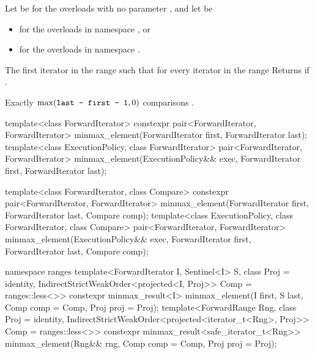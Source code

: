 \begin{itemdescr}
\begin{addedblock}
\pnum
Let  be  for the overloads with no parameter
, and let  be
\begin{itemize}
\item {} for the overloads in namespace , or
\item {} for
  the overloads in namespace .
\end{itemize}
\end{addedblock}

\pnum
\returns
The first iterator
in the range
such that for every iterator
in the range
Returns
if
.

\pnum
\complexity
Exactly
$\max(\texttt{last - first - 1}, 0)$
 comparisons
.
\end{itemdescr}


%
\begin{itemdecl}
template<class ForwardIterator>
  constexpr pair<ForwardIterator, ForwardIterator>
    minmax_element(ForwardIterator first, ForwardIterator last);
template<class ExecutionPolicy, class ForwardIterator>
  pair<ForwardIterator, ForwardIterator>
    minmax_element(ExecutionPolicy&& exec,
                   ForwardIterator first, ForwardIterator last);

template<class ForwardIterator, class Compare>
  constexpr pair<ForwardIterator, ForwardIterator>
    minmax_element(ForwardIterator first, ForwardIterator last, Compare comp);
template<class ExecutionPolicy, class ForwardIterator, class Compare>
  pair<ForwardIterator, ForwardIterator>
    minmax_element(ExecutionPolicy&& exec,
                   ForwardIterator first, ForwardIterator last, Compare comp);
\end{itemdecl}
\begin{addedblock}
\begin{itemdecl}
namespace ranges {
  template<ForwardIterator I, Sentinel<I> S, class Proj = identity,
      IndirectStrictWeakOrder<projected<I, Proj>> Comp = ranges::less<>>
    constexpr minmax_result<I>
      minmax_element(I first, S last, Comp comp = Comp{}, Proj proj = Proj{});
  template<ForwardRange Rng, class Proj = identity,
      IndirectStrictWeakOrder<projected<iterator_t<Rng>, Proj>> Comp = ranges::less<>>
    constexpr minmax_result<safe_iterator_t<Rng>>
      minmax_element(Rng&& rng, Comp comp = Comp{}, Proj proj = Proj{});
}
\end{itemdecl}
\end{addedblock}


